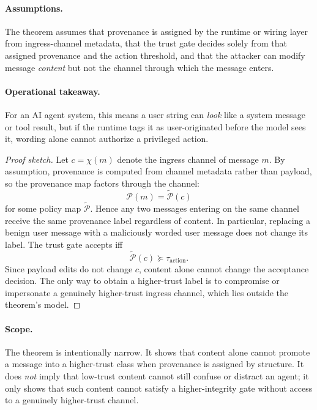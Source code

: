 \paragraph{Assumptions.}
The theorem assumes that provenance is assigned by the runtime or wiring layer from ingress-channel metadata, that the trust gate decides solely from that assigned provenance and the action threshold, and that the attacker can modify message \emph{content} but not the channel through which the message enters.

\paragraph{Operational takeaway.}
For an AI agent system, this means a user string can \emph{look} like a system message or tool result, but if the runtime tags it as user-originated before the model sees it, wording alone cannot authorize a privileged action.

\begin{proof}[Proof sketch]
Let $c=\chi(m)$ denote the ingress channel of message $m$. By assumption, provenance is computed from channel metadata rather than payload, so the provenance map factors through the channel:
\[
\mathcal{P}(m) = \widetilde{\mathcal{P}}(c)
\]
for some policy map $\widetilde{\mathcal{P}}$. Hence any two messages entering on the same channel receive the same provenance label regardless of content. In particular, replacing a benign user message with a maliciously worded user message does not change its label. The trust gate accepts iff
\[
\widetilde{\mathcal{P}}(c) \succeq \tau_{\text{action}}.
\]
Since payload edits do not change $c$, content alone cannot change the acceptance decision. The only way to obtain a higher-trust label is to compromise or impersonate a genuinely higher-trust ingress channel, which lies outside the theorem's model.
\end{proof}

\paragraph{Scope.}
The theorem is intentionally narrow. It shows that content alone cannot promote a message into a
higher-trust class when provenance is assigned by structure. It does \emph{not} imply that low-trust
content cannot still confuse or distract an agent; it only shows that such content cannot satisfy a
higher-integrity gate without access to a genuinely higher-trust channel.

